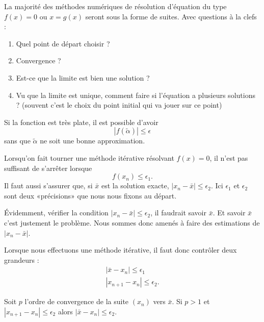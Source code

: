 La majorité des méthodes numériques de résolution d'équation du type \( f(x)=0\) ou \( x=g(x)\) seront sous la forme de suites. Avec questions à la clefs :
\begin{enumerate}
	\item
		Quel point de départ choisir ?
	\item
		Convergence ?
	\item
		Est-ce que la limite est bien une solution ?
	\item
		Vu que la limite est unique, comment faire si l'équation a plusieurs solutions ? (souvent c'est le choix du point initial qui va jouer sur ce point)
\end{enumerate}

\begin{normaltext}
	Si la fonction est très plate, il est possible d'avoir
	\begin{equation}
		| f(\tilde \alpha) |\leq \epsilon
	\end{equation}
	sans que \( \tilde \alpha\) ne soit une bonne approximation.

	Lorsqu'on fait tourner une méthode itérative résolvant \( f(x)=0\), il n'est pas suffisant de s'arrêter lorsque
	\begin{equation}
		f(x_n)\leq \epsilon_1.
	\end{equation}
	Il faut aussi s'assurer que, si \( \bar x\) est la solution exacte, \( | x_n-\bar x |\leq \epsilon_2\). Ici \( \epsilon_1\) et \( \epsilon_2\) sont deux «précisions» que nous nous fixons au départ.

	Évidemment, vérifier la condition \( | x_n-\bar x |\leq \epsilon_2\), il faudrait savoir \( \bar x\). Et savoir \( \bar x\) c'est justement le problème. Nous sommes donc amenés à faire des estimations de \( | x_n-\bar x |\).
\end{normaltext}

\begin{normaltext}
    Lorsque nous effectuons une méthode itérative, il faut donc contrôler deux grandeurs :
    \begin{subequations}
        \begin{align}
            | \bar x-x_n |\leq \epsilon_1\\
            | x_{n+1}-x_n |\leq \epsilon_2.
        \end{align}
    \end{subequations}
\end{normaltext}

\begin{proposition}
Soit \( p\) l'ordre de convergence de la suite \( (x_n)\) vers \( \bar x\). Si \( p>1\) et \( | x_{n+1}-x_n |\leq \epsilon_2\) alors \( | \bar x-x_n |\leq \epsilon_2\).
\end{proposition}

